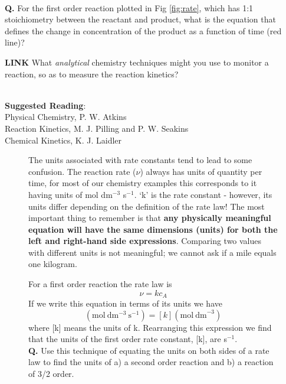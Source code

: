 \documentclass[	DIV=calc,%
							paper=a4,%
							fontsize=11pt,%
							twocolumn]{scrartcl}	 					%
\begin{document}
~
\\
\textbf{Q.} For the first order reaction plotted in Fig \ref{fig:rate}, which has 1:1 stoichiometry between the reactant and product, what is the equation that defines the change in concentration of the product as a function of time (red line)?

\noindent \textbf{LINK} What \emph{analytical} chemistry techniques might you use to monitor a reaction, so as to measure the reaction kinetics?

~
\\
\noindent \textbf{Suggested Reading}:\\
Physical Chemistry, P. W. Atkins\\
Reaction Kinetics, M. J. Pilling and P. W. Seakins\\
Chemical Kinetics, K. J. Laidler 

\begin{figure}[h]
    \begin{tcolorbox}[colback=blue!5,colframe=AirForceBlue!100!black,title=Dimensional Analysis]
        The units associated with rate constants tend to lead to some confusion. The reaction rate ($\nu$) always has units of quantity per time, for most of our chemistry examples this corresponds to it having units of mol dm$^{-3}$ s$^{-1}$. `k' is the rate constant - however, its units differ depending on the definition of the rate law!
        The most important thing to remember is that \textbf{any physically meaningful equation will have the same dimensions (units) for both the left and right-hand side expressions}. 
        Comparing two values with different units is not meaningful; we cannot ask if a mile equals one kilogram.
        
        For a first order reaction the rate law is 
        \begin{equation*}
            \nu = k c_A
        \end{equation*}
        If we write this equation in terms of its units we have
        \begin{equation*}
            (\mathrm{mol~dm^{-3}~s^{-1}}) = [k](\mathrm{mol~dm}^{-3})
        \end{equation*}
        where [k] means the units of k. Rearranging this expression we find that the units of the first order rate constant, [k], are s$^{-1}$. 
        \\
        
        \textbf{Q.} Use this technique of equating the units on both sides of a rate law to find the units of a) a second order reaction and b) a reaction of 3/2 order. 
    \end{tcolorbox}
\end{figure}
\end{document}
